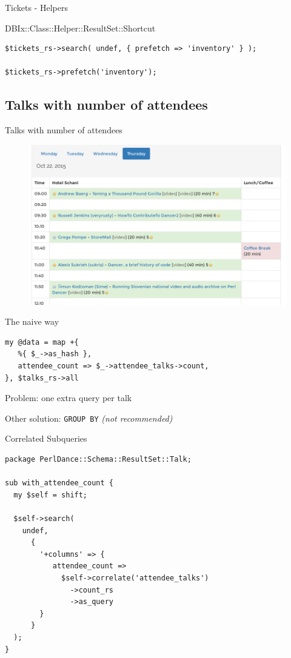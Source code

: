 \begin{frame}[fragile]{Tickets - Helpers}

DBIx::Class::Helper::ResultSet::Shortcut

\begin{lstlisting}
$tickets_rs->search( undef, { prefetch => 'inventory' } );

$tickets_rs->prefetch('inventory');
\end{lstlisting}
\end{frame}

\subsection{Talks with number of attendees}

\begin{frame}{Talks with number of attendees}
\begin{figure}[!ht]
\centering
\includegraphics[width=0.8\linewidth]{img/schedule2015.png}
\end{figure}
\end{frame}

\begin{frame}[fragile]{The naive way}
\begin{lstlisting}
my @data = map +{
   %{ $_->as_hash },
   attendee_count => $_->attendee_talks->count,
}, $talks_rs->all
\end{lstlisting}

Problem: one extra query per talk

Other solution: \verb|GROUP BY| \textit{(not recommended)}
\end{frame}

\begin{frame}[fragile]{Correlated Subqueries}
\begin{lstlisting}
package PerlDance::Schema::ResultSet::Talk;

sub with_attendee_count {
  my $self = shift;

  $self->search(
    undef,
      {
        '+columns' => {
           attendee_count =>
             $self->correlate('attendee_talks')
               ->count_rs
               ->as_query
        }
      }
  );
}
\end{lstlisting}
\end{frame}

